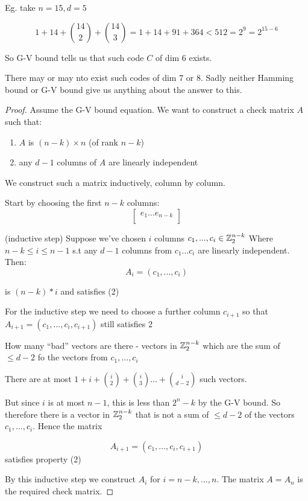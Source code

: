 \documentclass[]{article}
\theoremstyle{definition}
\theoremstyle{remark}
\numberwithin{equation}{section}
\begin{document}
		Eg. take $n=15, d=5$

		\[
			1 + 14 + \binom{14}{2} + \binom{14}{3}  = 1 + 14 + 91 + 364 < 512 = 2^9 = 2^{15-6}
		\]

		So G-V bound tells us that such code $C$ of dim $6$ exists.

		There may or may nto exist such codes of dim 7 or 8.
		Sadly neither Hamming bound or G-V bound give us anything about the answer to this.


		\begin{proof}
			Assume the G-V bound equation. We want to construct a check matrix $A$ such that:\tabularnewline
			\begin{enumerate}
				\item $A$ is $(n-k) \times n$ (of rank $n-k$)
				\item any $d-1$ columns of $A$ are linearly independent
			\end{enumerate}
			We construct such a matrix inductively, column by column.

			Start by choosing the first $n-k$ columns:
			\[
				\begin{bmatrix}
				e_1 ... e_{n-k}\\
				\end{bmatrix}
			\]

			(inductive step)
			Suppose we've chosen $i$ columns $c_1, ..., c_i \in \mathbb{Z}_2^{n-k}$ \tabularnewline
			Where $n-k \leq i \leq n-1$ s.t any $d-1$ columns from $c_1 ... c_i$ are linearly independent. \tabularnewline
			Then:
			\[
				A_i = (c_1, ... , c_i)
			\]

			is $(n-k)*i$ and satisfies (2)

			For the inductive step we need to choose a further column $c_{i+1}$ so that $A_{i+1} = (c_1, ..., c_i, c_{i+1})$ still satisfies 2

			How many ``bad'' vectors are there - vectors in $\mathbb{Z}_2^{n-k}$ which are the sum of $\leq d-2$ fo the vectors from $c_1, ... , c_i$

			There are at most $1 + i  + \binom{i}{2} + \binom{i}{3} ... + \binom{i}{d-2}$ such vectors.

			But since $i$ is at most $n-1$, this is less than $2^n-k$ by the G-V bound. So therefore there is a vector in $\mathbb{Z}_2^{n-k}$ that is not a sum of $\leq d-2$ of the vectors $c_1, ..., c_i$. Hence the matrix

			\[
				A_{i+1} = (c_1, ..., c_i, c_{i+1})
			\]
			satisfies property (2)

			By this inductive step we construct $A_i$ for $i = n-k, ..., n$. The matrix $A = A_n$ is the required check matrix.
		\end{proof}
\end{document}
